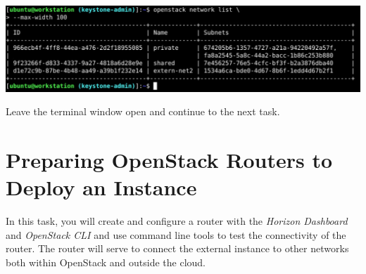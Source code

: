 \documentclass[letterpaper, 12pt]{article}
\begin{document}
\begin{enumerate}
\begin{labstep}
        \begin{center}
            \includegraphics[width=\linewidth]{images/part1/step17.png}
        \end{center}
    \end{labstep}

    \begin{labstep}
        Leave the terminal window open and continue to the next task.
    \end{labstep}

\end{enumerate}

\section{Preparing OpenStack Routers to Deploy an Instance}\label{sec:preparing_openstack_routers_to_deploy_an_instance}
In this task, you will create and configure a router with the \textit{Horizon Dashboard} and \textit{OpenStack CLI} and use command line tools to test the connectivity of the router.
The router will serve to connect the external instance to other networks both within OpenStack and outside the cloud.
\end{document}
